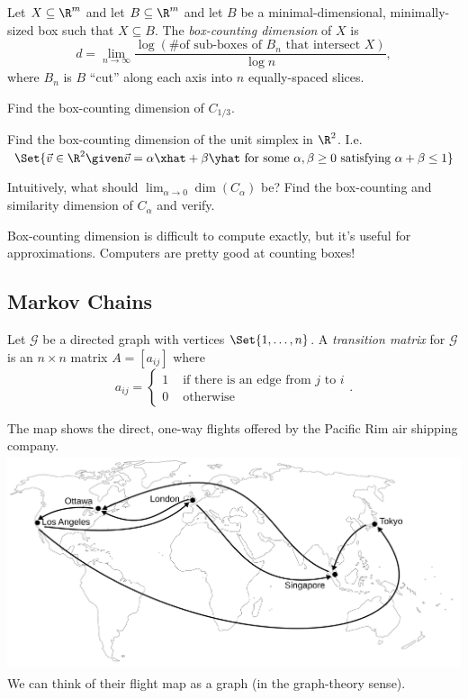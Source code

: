 	\begin{definition}
		Let $X\subseteq \R^m$ and let $B\subseteq \R^m$ and let $B$ be a minimal-dimensional, minimally-sized box such
		that $X\subseteq B$. The \emph{box-counting dimension} of $X$ is
		\[
			d=\lim_{n\to\infty} \frac{\log(\text{\# of sub-boxes of $B_n$ that intersect $X$})}{\log n},
		\]
		where $B_n$ is $B$ ``cut'' along each axis into $n$ equally-spaced slices.
	\end{definition}

	\begin{parts}[resume]
		\item Find the box-counting dimension of $C_{1/3}$.
		\item Find the box-counting dimension of the unit simplex in $\R^2$. I.e. $\Set{\vec v\in \R^2\given \vec v=
			\alpha\xhat+\beta \yhat\text{ for some }\alpha,\beta\geq 0\text{ satisfying }\alpha+\beta \leq 1
			}$
		\item Intuitively, what should $\lim_{\alpha\to 0} \dim(C_\alpha)$ be? Find the box-counting and similarity
			dimension of $C_\alpha$ and verify.
	\end{parts}
	
	Box-counting dimension is difficult to compute exactly, but it's useful for approximations. Computers are
	pretty good at counting boxes!

	\newpage
	\subsection*{Markov Chains}
	
	\begin{definition}
		Let $\mathcal G$ be a directed graph with vertices $\Set{1,\ldots, n}$.
		A \emph{transition matrix} for $\mathcal G$ is an $n\times n$ matrix $A=[a_{ij}]$ where
		\[
			a_{ij} = \begin{cases}
				1 &\text{ if there is an edge from $j$ to $i$}\\
				0 &\text{ otherwise}
			\end{cases}.
		\]
	\end{definition}

	\question
	The map shows the direct, one-way flights offered by the Pacific
	Rim air shipping company.
	\includegraphics[height=2.5in]{images/flight_map.pdf}
	We can think of their flight map as a graph (in the graph-theory sense).


